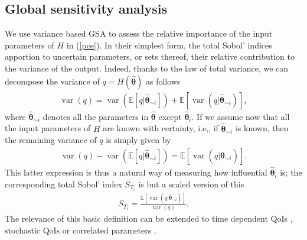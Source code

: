 \subsection{Global sensitivity analysis} 
We use variance based GSA to assess the relative importance of the input parameters of $H$ in (\ref{pce}). In their simplest form,  the total Sobol' indices \cite{saltellitotalindex} apportion to uncertain parameters, or sets thereof, their relative contribution to the variance of the output. Indeed, thanks to the law of total variance, we can decompose the variance of $q = H(\hat{\boldsymbol{\theta}})$ as follows
\begin{eqnarray}
\operatorname{var}(q) = \operatorname{var}(\mathbb E[q|\hat{\boldsymbol{\theta}}_{\sim i}]) + \mathbb E[\operatorname{var}(q|\hat{\boldsymbol{\theta}}_{\sim i})], \label{ltv}
\end{eqnarray}
where $\hat{\boldsymbol{\theta}}_{\sim i}$ denotes all the parameters in $\hat{\boldsymbol{\theta}}$ except $\hat{\boldsymbol{\theta}}_i$. If we assume now that all the input parameters of $H$ are known with certainty, i.e,, if $\hat{\boldsymbol{\theta}}_{\sim i}$ is known, then the remaining variance of $q$ is simply given by 
\begin{eqnarray*}
\operatorname{var}(q) - \operatorname{var}(\mathbb E[q|\hat{\boldsymbol{\theta}}_{\sim i}]) = \mathbb E[\operatorname{var}(q|\hat{\boldsymbol{\theta}}_{\sim i})]. 
\end{eqnarray*}
This latter expression is thus a natural way of measuring how influential $\hat{\boldsymbol{\theta}}_i$ is; the corresponding total Sobol' index $S_{T_i}$ is but a scaled version of this
\begin{eqnarray}
S_{T_i} = \frac{\mathbb E[\operatorname{var}(q|\hat{\boldsymbol{\theta}}_{\sim i})]}{\operatorname{var}(q) }. \label{sobol}
\end{eqnarray}
The relevance of this basic definition can be extended to time dependent QoIs \cite{timegsa}, stochastic QoIs \cite{stogsa} or correlated parameters \cite{corvar}.




